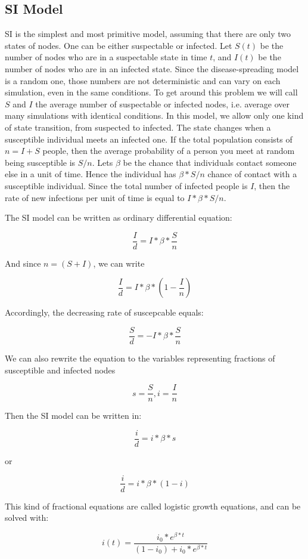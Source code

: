 \documentclass[nostrict]{szablonPG}
\begin{document}
\subsection{SI Model}
SI is the simplest and most primitive model, assuming that there are only two states of nodes. One can be either suspectable or infected. Let $S(t)$ be the number of nodes who are in a suspectable state in time $t$, and $I(t)$ be the number of nodes who are in an infected state. Since the disease-spreading model is a random one, those numbers are not deterministic and can vary on each simulation, even in the same conditions. To get around this problem we will call $S$ and $I$ the average number of suspectable or infected nodes, i.e. average over many simulations with identical conditions.
In this model, we allow only one kind of state transition, from suspected to infected. The state changes when a susceptible individual meets an infected one. If the total population consists of $n = I + S$ people, then the average probability of a person you meet at random being susceptible is $S/n$.
Lets $\beta$ be the chance that individuals contact someone else in a unit of time. 
Hence the individual has $\beta*S/n$ chance of contact with a susceptible individual.
Since the total number of infected people is $I$, then the rate of new infections per unit of time is equal to $I * \beta*S/n$.

The SI model can be written as ordinary differential equation:

\[\frac{I}{d} = I * \beta * \frac{S}{n}\]

And since $n = (S + I)$, we can write 

\[\frac{I}{d} = I * \beta * (1 - \frac{I}{n})\]

Accordingly, the decreasing rate of suscepcable equals:

\[\frac{S}{d} = - I * \beta * \frac{S}{n}\]

We can also rewrite the equation to the variables representing fractions of susceptible and infected nodes

\[s = \frac{S}{n}, i = \frac{I}{n}\]

Then the SI model can be written in:

\[\frac{i}{d} = i*\beta*s\]

or 

\[\frac{i}{d} = i * \beta * (1-i)\]

This kind of fractional equations are called logistic growth equations, and can be solved with:

\[i(t) =\frac{ i_0 * e^{\beta*t} }{(1 - i_0) + i_0 * e^{\beta*t}}\]
\end{document}
